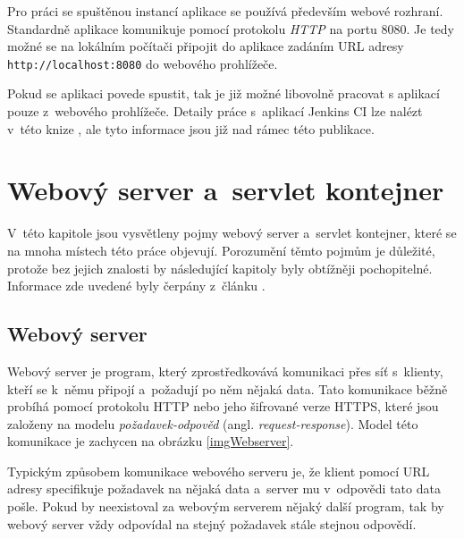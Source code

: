             Pro práci se spuštěnou instancí aplikace se používá především webové rozhraní. Standardně aplikace
            komunikuje pomocí protokolu \emph{HTTP} na portu 8080. Je tedy možné se na lokálním počítači připojit do aplikace zadáním URL adresy 
            \texttt{http://localhost:8080} do webového prohlížeče. 

            Pokud se aplikaci povede spustit, tak je již možné libovolně pracovat s aplikací pouze z~webového prohlížeče. Detaily práce s~aplikací Jenkins CI
            lze nalézt v~této knize \cite{jenkinsBook}, ale tyto informace jsou již nad rámec této publikace.


            
       
    \section{Webový server a~servlet kontejner} \label{servletWebserver}
        V~této kapitole jsou vysvětleny pojmy webový server a~servlet kontejner, které se 
        na mnoha místech této práce objevují. Porozumění těmto pojmům je důležité, protože bez
        jejich znalosti by následující kapitoly byly obtížněji pochopitelné.
        Informace zde uvedené byly čerpány z~článku \cite{webserverVsServletPage}.

        \subsection{Webový server}
            Webový server je program, který zprostředkovává komunikaci přes síť s~klienty, kteří
            se k~němu připojí a~požadují po něm nějaká data. Tato komunikace běžně probíhá pomocí protokolu HTTP
            nebo jeho šifrované verze HTTPS,
            které jsou založeny na modelu \emph{požadavek-odpověd} (angl. \emph{request-response}).
            Model této komunikace je zachycen na obrázku \ref{imgWebserver}.
            
            Typickým způsobem komunikace webového serveru je, 
            že klient pomocí URL adresy specifikuje požadavek na nějaká
            data a~server mu v~odpovědi tato data pošle. Pokud by neexistoval za webovým serverem nějaký další
            program, tak by webový server vždy odpovídal na stejný požadavek stále stejnou odpovědí.

